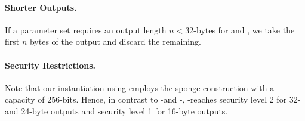    \paragraph{Shorter Outputs.} If a parameter set requires an
   output length $n < 32$-bytes for \sphincsF and \sphincsPRF,
   we take the first $n$ bytes of the output and discard the remaining.

   \paragraph{Security Restrictions.} Note that our instantiation using \haraka
   employs the sponge construction with a capacity of 256-bits. Hence, in
   contrast to \spx-\shatwo and \spx-\shathree, \spx-\haraka reaches
   security level 2 for 32- and 24-byte outputs and security level 1 for
   16-byte outputs.



